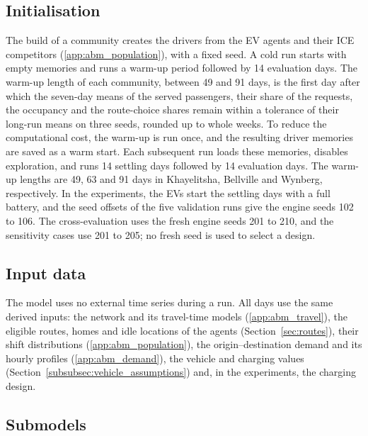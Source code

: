 \subsection{Initialisation}
\label{app:abm_initialisation}

The build of a community creates the drivers from the EV agents and their ICE competitors (\ref{app:abm_population}), with a fixed seed. A cold run starts with empty memories and runs a warm-up period followed by 14 evaluation days. The warm-up length of each community, between 49 and 91 days, is the first day after which the seven-day means of the served passengers, their share of the requests, the occupancy and the route-choice shares remain within a tolerance of their long-run means on three seeds, rounded up to whole weeks. To reduce the computational cost, the warm-up is run once, and the resulting driver memories are saved as a warm start. Each subsequent run loads these memories, disables exploration, and runs 14 settling days followed by 14 evaluation days. The warm-up lengths are 49, 63 and 91 days in Khayelitsha, Bellville and Wynberg, respectively. In the experiments, the EVs start the settling days with a full battery, and the seed offsets of the five validation runs give the engine seeds 102 to 106.
The cross-evaluation uses the fresh engine seeds 201 to 210, and the sensitivity cases use 201 to 205; no fresh seed is used to select a design.

\subsection{Input data}
\label{app:abm_inputs}

The model uses no external time series during a run. All days use the same derived inputs: the network and its travel-time models (\ref{app:abm_travel}), the eligible routes, homes and idle locations of the agents (Section~\ref{sec:routes}), their shift distributions (\ref{app:abm_population}), the origin--destination demand and its hourly profiles (\ref{app:abm_demand}), the vehicle and charging values (Section~\ref{subsubsec:vehicle_assumptions}) and, in the experiments, the charging design.

\subsection{Submodels}
\label{app:abm_submodels}

